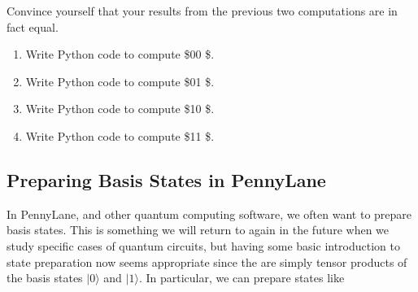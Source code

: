 \documentclass[11pt]{article}
\providecommand{\tightlist}{%
      \setlength{\itemsep}{0pt}\setlength{\parskip}{0pt}}
\begin{document}
Convince yourself that your results from the previous two computations
are in fact equal.

    \begin{enumerate}
\def\labelenumi{\arabic{enumi}.}
\setcounter{enumi}{4}
\tightlist
\item
  Write Python code to compute \$\textbar{}0\rangle \otimes \textbar{}0
  \rangle \$.
\item
  Write Python code to compute \$\textbar{}0\rangle \otimes \textbar{}1
  \rangle \$.
\item
  Write Python code to compute \$\textbar{}1\rangle \otimes \textbar{}0
  \rangle \$.
\item
  Write Python code to compute \$\textbar{}1\rangle \otimes \textbar{}1
  \rangle \$.
\end{enumerate}

    \hypertarget{preparing-basis-states-in-pennylane}{%
\subsection{Preparing Basis States in
PennyLane}\label{preparing-basis-states-in-pennylane}}

    In PennyLane, and other quantum computing software, we often want to
prepare basis states. This is something we will return to again in the
future when we study specific cases of quantum circuits, but having some
basic introduction to state preparation now seems appropriate since the
are simply tensor products of the basis states \(|0\rangle\) and
\(|1\rangle\). In particular, we can prepare states like
\end{document}

